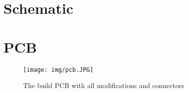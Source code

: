 \appendix

\section{Schematic}



\section{\ac{PCB}}

\begin{figure}[!h]
    \centering
    \texttt{[image: img/pcb.JPG]}
    \caption{The build \ac{PCB} with all modifications and connectors}
    \label{fig:pcb}
\end{figure}
